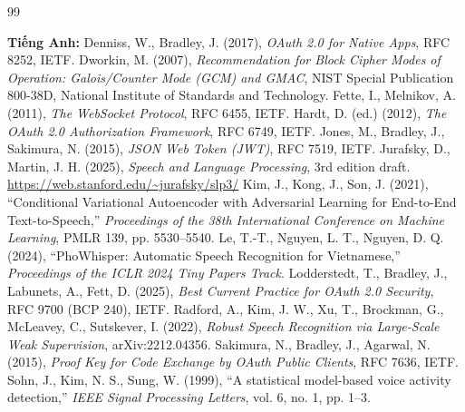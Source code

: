 \renewcommand{\bibname}{DANH MỤC TÀI LIỆU THAM KHẢO}
\clearpage\addcontentsline{toc}{chapter}{\bibname}
\makeatletter\renewcommand{}\makeatother
\newcommand{\nhomtailieu}[1]{\item[]\hspace{-\labelwidth}\hspace{-\labelsep}\textbf{#1}}
\begin{thebibliography}{99}
\small\RaggedRight   %
\nhomtailieu{Tiếng Anh:}
 Denniss, W., Bradley, J. (2017), \textit{OAuth 2.0 for Native Apps}, RFC 8252, IETF.
 Dworkin, M. (2007), \textit{Recommendation for Block Cipher Modes of Operation: Galois/Counter Mode (GCM) and GMAC}, NIST Special Publication 800-38D, National Institute of Standards and Technology.
 Fette, I., Melnikov, A. (2011), \textit{The WebSocket Protocol}, RFC 6455, IETF.
 Hardt, D. (ed.) (2012), \textit{The OAuth 2.0 Authorization Framework}, RFC 6749, IETF.
 Jones, M., Bradley, J., Sakimura, N. (2015), \textit{JSON Web Token (JWT)}, RFC 7519, IETF.
 Jurafsky, D., Martin, J. H. (2025), \textit{Speech and Language Processing}, 3rd edition draft. \url{https://web.stanford.edu/~jurafsky/slp3/}
 Kim, J., Kong, J., Son, J. (2021), ``Conditional Variational Autoencoder with Adversarial Learning for End-to-End Text-to-Speech,'' \textit{Proceedings of the 38th International Conference on Machine Learning}, PMLR 139, pp. 5530--5540.
 Le, T.-T., Nguyen, L. T., Nguyen, D. Q. (2024), ``PhoWhisper: Automatic Speech Recognition for Vietnamese,'' \textit{Proceedings of the ICLR 2024 Tiny Papers Track}.
 Lodderstedt, T., Bradley, J., Labunets, A., Fett, D. (2025), \textit{Best Current Practice for OAuth 2.0 Security}, RFC 9700 (BCP 240), IETF.
 Radford, A., Kim, J. W., Xu, T., Brockman, G., McLeavey, C., Sutskever, I. (2022), \textit{Robust Speech Recognition via Large-Scale Weak Supervision}, arXiv:2212.04356.
 Sakimura, N., Bradley, J., Agarwal, N. (2015), \textit{Proof Key for Code Exchange by OAuth Public Clients}, RFC 7636, IETF.
 Sohn, J., Kim, N. S., Sung, W. (1999), ``A statistical model-based voice activity detection,'' \textit{IEEE Signal Processing Letters}, vol. 6, no. 1, pp. 1--3.


\end{thebibliography}
